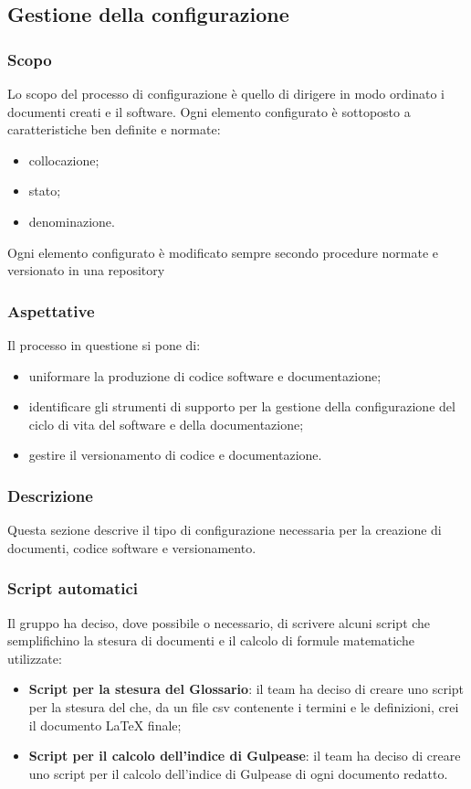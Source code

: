 \subsection{Gestione della configurazione}\label{3.2}

\subsubsection{Scopo}\label{3.2.1}
Lo scopo del processo di configurazione è quello di dirigere in modo ordinato i documenti creati e il software. Ogni elemento configurato è sottoposto a caratteristiche ben definite e normate:
\begin{itemize}
 \item collocazione;
 \item stato;
 \item denominazione.
\end{itemize}
Ogni elemento configurato è modificato sempre secondo procedure normate e versionato in una repository

\subsubsection{Aspettative}
Il processo in questione si pone di:
\begin{itemize}
\item uniformare la produzione di codice software e documentazione;
\item identificare gli strumenti di supporto per la gestione della configurazione del ciclo di vita del software e della documentazione;
\item gestire il versionamento di codice e documentazione.
\end{itemize}


\subsubsection{Descrizione}
Questa sezione descrive il tipo di configurazione necessaria per la creazione di documenti, codice software e versionamento.



\subsubsection{Script automatici}
Il gruppo ha deciso, dove possibile o necessario, di scrivere alcuni script che semplifichino la stesura di documenti e il calcolo di formule matematiche utilizzate:
\begin{itemize}
	\item \textbf{Script per la stesura del Glossario}: il team ha deciso di creare uno script per la stesura del \Glossariov che, da un file csv contenente i termini e le definizioni, crei il documento \LaTeX{} finale;
	\item \textbf{Script per il calcolo dell'indice di Gulpease}: il team ha deciso di creare uno script per il calcolo dell'indice di Gulpease di ogni documento redatto.
\end{itemize}